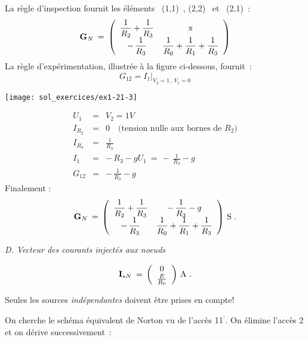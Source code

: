 La règle d'inspection fournit les éléments \ (1,1)~, (2,2) \ et \ (2,1)~:
\[ {\bf G}_N \: = \: 
\left( \begin{array}{cc}
\dfrac{1}{R_2} + \dfrac{1}{R_3} & \text{x} \\
-\, \dfrac{1}{R_3} & \dfrac{1}{R_0} + \dfrac{1}{R_1} + \dfrac{1}{R_3}
\end{array} \right) \]
La règle d'expérimentation, illustrée à la figure ci-dessous, fournit~:
\[  G_{12} = \left. I_1\right|_{V_2=1\, , \, V_1=0} \]
\begin{center}
\texttt{[image: sol\_exercices/ex1-21-3]}
\end{center}
\begin{eqnarray*}
U_1 &=& V_2 = 1 V\\
I_{R_2} &=& 0 \quad \mbox{(tension nulle aux bornes de $R_2$)}\\
I_{R_3} &=& \frac{1}{R_3}\\
I_1 &=& -\, {R_3} - g U_1 \: = \, - \, \frac{1}{R_3} - g\\
G_{12} &=& -\, \frac{1}{R_3} - g
\end{eqnarray*}
Finalement :
\[ {\bf G}_N \: = \, \left( \begin{array}{cc}
\dfrac{1}{R_2} + \dfrac{1}{R_3} & -\, \dfrac{1}{R_3} - g\\
-\, \dfrac{1}{R_3} & \dfrac{1}{R_0} + \dfrac{1}{R_1} + \dfrac{1}{R_3}
\end{array} \right) \, \text{S~.}\]


{\em D.  Vecteur des courants injectés aux noeuds}

\[ {\bf I}_{sN} \: = \, \left( \begin{array}{c} 0 \\ \frac{E}{R_0} \end{array} 
\right) \, \text{A~.}\]

Seules les sources {\em indépendantes} doivent être prises en compte!


On cherche le schéma équivalent de Norton vu de l'accès 11$^{'}$. On
élimine l'accès 2 et on dérive successivement~:

